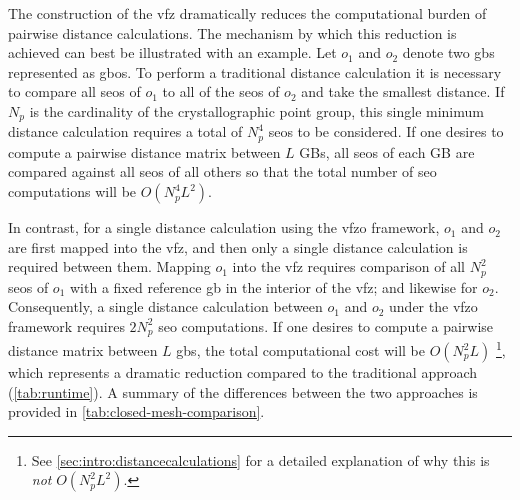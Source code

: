 \documentclass[final,twocolumn,12pt]{elsarticle}
\begin{document}
The construction of the \gls{vfz} dramatically reduces the computational burden of pairwise distance calculations. The mechanism by which this reduction is achieved can best be illustrated with an example. Let $o_1$ and $o_2$ denote two \glspl{gb} represented as \glspl{gbo}. 
To perform a traditional distance calculation it is necessary to compare all \glspl{seo} of $o_1$ to all of the \glspl{seo} of $o_2$ and take the smallest distance. If $N_p$ is the cardinality of the crystallographic point group, this single minimum distance calculation requires a total of $N_p^4$ \glspl{seo} to be considered. If one desires to compute a pairwise distance matrix between $L$ GBs, all \glspl{seo} of each GB are compared against all \glspl{seo} of all others so that the total number of \gls{seo} computations will be $O(N_p^4L^2)$.

In contrast, for a single distance calculation using the \gls{vfzo} framework, $o_1$ and $o_2$ are first mapped into the \gls{vfz}, and then only a single distance calculation is required between them. Mapping $o_1$ into the \gls{vfz} requires comparison of all $N_p^2$ \glspl{seo} of $o_1$ with a fixed reference \gls{gb} in the interior of the \gls{vfz}; and likewise for $o_2$. Consequently, a single distance calculation between $o_1$ and $o_2$ under the \gls{vfzo} framework requires $2N_p^2$ \gls{seo} computations. If one desires to compute a pairwise distance matrix between $L$ \glspl{gb}, the total computational cost will be $O(N_p^2L)$ \footnote{See \cref{sec:intro:distancecalculations} for a detailed explanation of why this is \emph{not} $O(N_p^2L^2)$.}, which represents a dramatic reduction compared to the traditional approach (\cref{tab:runtime}). A summary of the differences between the two approaches is provided in \cref{tab:closed-mesh-comparison}.
\end{document}
